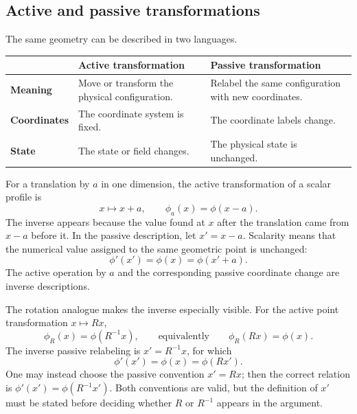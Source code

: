 \documentclass[11pt]{article}
\begin{document}
\subsection{Active and passive transformations}

The same geometry can be described in two languages.

\begin{center}
\begin{tabular}{>{\bfseries}p{} p{} p{}}
 & Active transformation & Passive transformation \\
\toprule
Meaning & Move or transform the physical configuration. & Relabel the same
configuration with new coordinates. \\
Coordinates & The coordinate system is fixed. & The coordinate labels change. \\
State & The state or field changes. & The physical state is unchanged. \\
\bottomrule
\end{tabular}
\end{center}

For a translation by $a$ in one dimension, the active transformation of a
scalar profile is
\begin{equation}
  x\longmapsto x+a,
  \qquad
  \phi_a(x)=\phi(x-a).
  \label{eq:activetranslation}
\end{equation}
The inverse appears because the value found at $x$ after the translation came
from $x-a$ before it.  In the passive description, let $x'=x-a$.  Scalarity
means that the numerical value assigned to the same geometric point is
unchanged:
\begin{equation}
  \phi'(x')=\phi(x)=\phi(x'+a).
  \label{eq:passivetranslation}
\end{equation}
The active operation by $a$ and the corresponding passive coordinate change
are inverse descriptions.

The rotation analogue makes the inverse especially visible.  For the active
point transformation $x\mapsto Rx$,
\begin{equation}
  \phi_R(x)=\phi(R^{-1}x),
  \qquad\text{equivalently}\qquad
  \phi_R(Rx)=\phi(x).
  \label{eq:activerotation}
\end{equation}
The inverse passive relabeling is $x'=R^{-1}x$, for which
\begin{equation}
  \phi'(x')=\phi(x)=\phi(Rx').
  \label{eq:passiverotation}
\end{equation}
One may instead choose the passive convention $x'=Rx$; then the correct
relation is $\phi'(x')=\phi(R^{-1}x')$.  Both conventions are valid, but the
definition of $x'$ must be stated before deciding whether $R$ or $R^{-1}$
appears in the argument.
\end{document}
